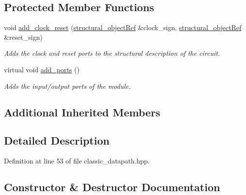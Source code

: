 \subsection*{Protected Member Functions}
\begin{DoxyCompactItemize}
\item 
void \hyperlink{classclassic__datapath_ae85a2f537298fac7a7f458b491ea94a5}{add\+\_\+clock\+\_\+reset} (\hyperlink{structural__objects_8hpp_a8ea5f8cc50ab8f4c31e2751074ff60b2}{structural\+\_\+object\+Ref} \&clock\+\_\+sign, \hyperlink{structural__objects_8hpp_a8ea5f8cc50ab8f4c31e2751074ff60b2}{structural\+\_\+object\+Ref} \&reset\+\_\+sign)
\begin{DoxyCompactList}\small\item\em Adds the clock and reset ports to the structural description of the circuit. \end{DoxyCompactList}\item 
virtual void \hyperlink{classclassic__datapath_a857c8c07a0bb612dd5e36bba9c48a14d}{add\+\_\+ports} ()
\begin{DoxyCompactList}\small\item\em Adds the input/output ports of the module. \end{DoxyCompactList}\end{DoxyCompactItemize}
\subsection*{Additional Inherited Members}


\subsection{Detailed Description}


Definition at line 53 of file classic\+\_\+datapath.\+hpp.



\subsection{Constructor \& Destructor Documentation}
\mbox{\label{classclassic__datapath_a7ea2b03fd17599b8578d7f403642f0aa}} 
